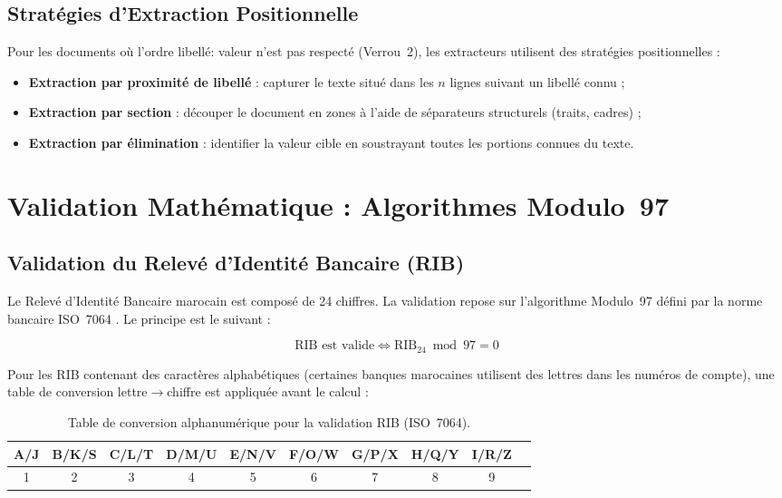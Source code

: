 \subsection{Strat\'{e}gies d'Extraction Positionnelle}

Pour les documents o\`{u} l'ordre \og libell\'{e}: valeur \fg{} n'est pas respect\'{e} (Verrou~2), les extracteurs utilisent des strat\'{e}gies positionnelles :

\begin{itemize}[leftmargin=*, itemsep=4pt]
    \item \textbf{Extraction par proximit\'{e} de libell\'{e}} : capturer le texte situ\'{e} dans les $n$ lignes suivant un libell\'{e} connu ;
    \item \textbf{Extraction par section} : d\'{e}couper le document en zones \`{a} l'aide de s\'{e}parateurs structurels (traits, cadres) ;
    \item \textbf{Extraction par \'{e}limination} : identifier la valeur cible en soustrayant toutes les portions connues du texte.
\end{itemize}

\section{Validation Math\'{e}matique : Algorithmes Modulo~97}

\subsection{Validation du Relev\'{e} d'Identit\'{e} Bancaire (RIB)}

Le Relev\'{e} d'Identit\'{e} Bancaire marocain est compos\'{e} de 24 chiffres. La validation repose sur l'algorithme Modulo~97 d\'{e}fini par la norme bancaire ISO~7064 \cite{iso7064}. Le principe est le suivant :

\begin{equation}
\text{RIB est valide} \iff \text{RIB}_{24} \bmod 97 = 0
\label{eq:modulo97-rib}
\end{equation}

Pour les RIB contenant des caract\`{e}res alphab\'{e}tiques (certaines banques marocaines utilisent des lettres dans les num\'{e}ros de compte), une table de conversion lettre$\to$chiffre est appliqu\'{e}e avant le calcul :

\begin{table}[H]
\centering
\small
\begin{tabular}{cccccccccc}
\toprule
\rowcolor{lightblue}
A/J & B/K/S & C/L/T & D/M/U & E/N/V & F/O/W & G/P/X & H/Q/Y & I/R/Z \\
\midrule
1 & 2 & 3 & 4 & 5 & 6 & 7 & 8 & 9 \\
\bottomrule
\end{tabular}
\caption{Table de conversion alphanum\'{e}rique pour la validation RIB (ISO~7064).}
\label{tab:rib-letter-map}
\end{table}

